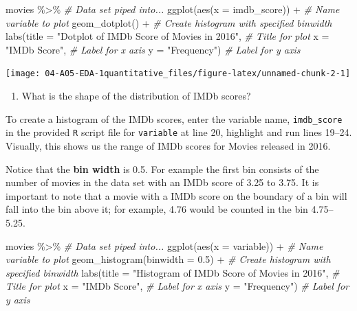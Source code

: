 \documentclass[
]{report}
\newenvironment{Shaded}{\begin{snugshade}}{\end{snugshade}}
\newcommand{\AttributeTok}[1]{\textcolor[rgb]{0.77,0.63,0.00}{#1}}
\newcommand{\CommentTok}[1]{\textcolor[rgb]{0.56,0.35,0.01}{\textit{#1}}}
\newcommand{\FloatTok}[1]{\textcolor[rgb]{0.00,0.00,0.81}{#1}}
\newcommand{\FunctionTok}[1]{\textcolor[rgb]{0.00,0.00,0.00}{#1}}
\newcommand{\NormalTok}[1]{#1}
\newcommand{\SpecialCharTok}[1]{\textcolor[rgb]{0.00,0.00,0.00}{#1}}
\newcommand{\StringTok}[1]{\textcolor[rgb]{0.31,0.60,0.02}{#1}}
\providecommand{\tightlist}{%
  \setlength{\itemsep}{0pt}\setlength{\parskip}{0pt}}
\begin{document}
\begin{Shaded}
\begin{Highlighting}[]
\NormalTok{movies }\SpecialCharTok{\%\textgreater{}\%} \CommentTok{\# Data set piped into...}
\FunctionTok{ggplot}\NormalTok{(}\FunctionTok{aes}\NormalTok{(}\AttributeTok{x =}\NormalTok{ imdb\_score)) }\SpecialCharTok{+}   \CommentTok{\# Name variable to plot}
  \FunctionTok{geom\_dotplot}\NormalTok{() }\SpecialCharTok{+}  \CommentTok{\# Create histogram with specified binwidth}
  \FunctionTok{labs}\NormalTok{(}\AttributeTok{title =} \StringTok{"Dotplot of IMDb Score of Movies in 2016"}\NormalTok{, }\CommentTok{\# Title for plot}
       \AttributeTok{x =} \StringTok{"IMDb Score"}\NormalTok{, }\CommentTok{\# Label for x axis}
       \AttributeTok{y =} \StringTok{"Frequency"}\NormalTok{) }\CommentTok{\# Label for y axis}
\end{Highlighting}
\end{Shaded}

\begin{center}\texttt{[image: 04-A05-EDA-1quantitative\_files/figure-latex/unnamed-chunk-2-1]} \end{center}

\begin{enumerate}
\def\labelenumi{\arabic{enumi}.}
\setcounter{enumi}{7}
\tightlist
\item
  What is the shape of the distribution of IMDb scores?
\end{enumerate}

\vspace{0.2in}

To create a histogram of the IMDb scores, enter the variable name, \texttt{imdb\_score} in the provided \texttt{R} script file for \texttt{variable} at line 20, highlight and run lines 19--24. Visually, this shows us the range of IMDb scores for Movies released in 2016.

Notice that the \textbf{bin width} is 0.5. For example the first bin consists of the number of movies in the data set with an IMDb score of 3.25 to 3.75. It is important to note that a movie with a IMDb score on the boundary of a bin will fall into the bin above it; for example, 4.76 would be counted in the bin 4.75--5.25.

\begin{Shaded}
\begin{Highlighting}[]
\NormalTok{movies }\SpecialCharTok{\%\textgreater{}\%} \CommentTok{\# Data set piped into...}
\FunctionTok{ggplot}\NormalTok{(}\FunctionTok{aes}\NormalTok{(}\AttributeTok{x =}\NormalTok{ variable)) }\SpecialCharTok{+}   \CommentTok{\# Name variable to plot}
  \FunctionTok{geom\_histogram}\NormalTok{(}\AttributeTok{binwidth =} \FloatTok{0.5}\NormalTok{) }\SpecialCharTok{+}  \CommentTok{\# Create histogram with specified binwidth}
  \FunctionTok{labs}\NormalTok{(}\AttributeTok{title =} \StringTok{"Histogram of IMDb Score of Movies in 2016"}\NormalTok{, }\CommentTok{\# Title for plot}
       \AttributeTok{x =} \StringTok{"IMDb Score"}\NormalTok{, }\CommentTok{\# Label for x axis}
       \AttributeTok{y =} \StringTok{"Frequency"}\NormalTok{) }\CommentTok{\# Label for y axis}
\end{Highlighting}
\end{Shaded}
\end{document}
